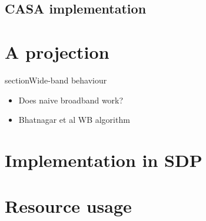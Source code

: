 \documentclass[11pt,a4paper]{article}
\begin{document}
\subsection{CASA implementation}

\clearpage
\section{A projection}
\label{sec:minor}

\clearpage
section{Wide-band behaviour}
\label{sec:wideband}

\begin{itemize}
\item Does naive broadband work?
\item Bhatnagar et al WB algorithm	
\end{itemize}


\clearpage
\section{Implementation in SDP}
\label{sec:implementation}

\clearpage
\section{Resource usage}
\label{sec:resource}





\clearpage {}
%
\end{document}
